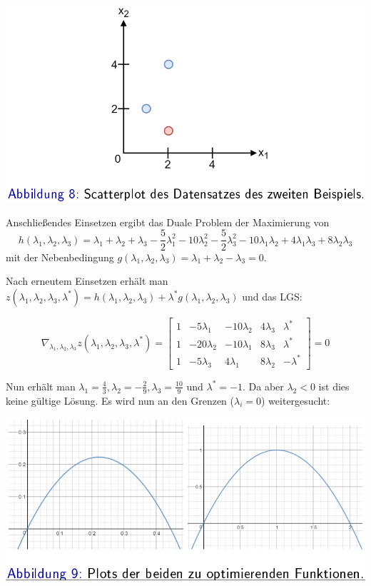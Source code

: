 \documentclass{report}
\begin{document}
\begin{center}
  \includegraphics[scale=.275]{ml06_8}
\end{center}

Anschließendes Einsetzen ergibt das Duale Problem der Maximierung von 
$$h(\lambda_1, \lambda_2, \lambda_3) = \lambda_1 + \lambda_2 + \lambda_3 - \frac{5}{2}\lambda_1^2 - 10\lambda_2^2 -
\frac{5}{2}\lambda_3^2 - 10\lambda_1\lambda_2 + 4\lambda_1\lambda_3 + 8\lambda_2\lambda_3$$
mit der Nebenbedingung $g(\lambda_1, \lambda_2, \lambda_3) = \lambda_1 + \lambda_2 - \lambda_3 = 0$.

Nach erneutem Einsetzen erhält man $z(\lambda_1, \lambda_2, \lambda_3, \lambda^*) = h(\lambda_1, \lambda_2, \lambda_3) +
\lambda^*g(\lambda_1, \lambda_2, \lambda_3)$ und das LGS:

$$\nabla_{\lambda_1, \lambda_2, \lambda_3}z(\lambda_1, \lambda_2, \lambda_3, \lambda^*) =
\begin{bmatrix}
  1 & -5\lambda_1 & -10\lambda_2 & 4\lambda_3 & \lambda^*\\
  1 & -20\lambda_2 & -10\lambda_1 & 8\lambda_3 & \lambda^*\\
  1 & -5\lambda_3 & 4\lambda_1 & 8\lambda_2 & -\lambda^*
\end{bmatrix} = 0$$

Nun erhält man $\lambda_1 = \frac{4}{3}, \lambda_2 = -\frac{2}{9}, \lambda_3 = \frac{10}{9}$ und $\lambda^*=-1$.
Da aber $\lambda_2 < 0$ ist dies keine gültige Lösung. Es wird nun an den Grenzen ($\lambda_i = 0$) weitergesucht:

\begin{center}
  \includegraphics[scale=.275]{ml06_9}
\end{center}
\end{document}
